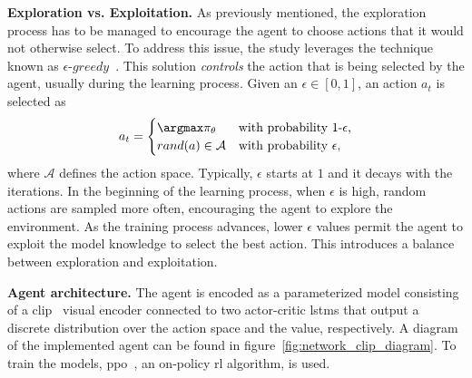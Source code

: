 \textbf{Exploration vs. Exploitation.}
As previously mentioned, the exploration process has to be managed to encourage the agent to choose actions that it would not otherwise select.
To address this issue, the study leverages the technique known as $\epsilon\text{-}greedy$~\cite{mnih2013}.
This solution \emph{controls} the action that is being selected by the agent, usually during the learning process.
Given an $\epsilon \in [0, 1]$, an action $a_t$ is selected as
\begin{equation}
    \label{eq:eps-greedy}
    a_t = \begin{cases}
              \argmax\pi_\theta & \mbox{with probability 1-$\epsilon$,}     \\
              rand(a) \in \mathcal{A} & \mbox{with probability $\epsilon$,} \\
    \end{cases}
\end{equation}
where $\mathcal{A}$ defines the action space.
Typically, $\epsilon$ starts at $1$ and it decays with the iterations.
In the beginning of the learning process, \ie when $\epsilon$ is high, random actions are sampled more often, encouraging the agent to explore the environment.
As the training process advances, lower $\epsilon$ values permit the agent to exploit the model knowledge to select the best action.
This introduces a balance between exploration and exploitation.

\textbf{Agent architecture.} The agent is encoded as a parameterized model consisting of a \acrshort{clip}~\cite{khandelwal2022} visual encoder connected to two actor-critic \acrshort{lstm}s that output a discrete distribution over the action space and the value, respectively.
A diagram of the implemented agent can be found in figure~\ref{fig:network_clip_diagram}.
To train the models, \acrfull{ppo}~\cite{schulman2017}, an on-policy \acrshort{rl} algorithm, is used.

